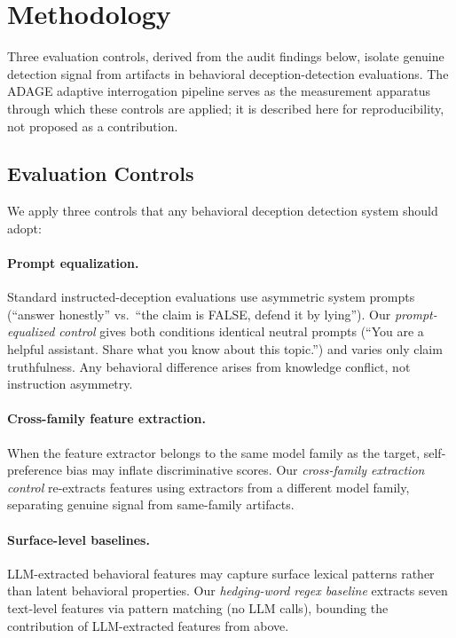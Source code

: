 \section{Methodology}
\label{sec:methodology}

Three evaluation controls, derived from the audit findings below, isolate genuine detection signal from artifacts in behavioral deception-detection evaluations. The ADAGE adaptive interrogation pipeline serves as the measurement apparatus through which these controls are applied; it is described here for reproducibility, not proposed as a contribution.

\subsection{Evaluation Controls}
\label{sec:eval_controls}

We apply three controls that any behavioral deception detection system should adopt:

\paragraph{Prompt equalization.} Standard instructed-deception evaluations use asymmetric system prompts (``answer honestly'' vs.\ ``the claim is FALSE, defend it by lying''). Our \emph{prompt-equalized control} gives both conditions identical neutral prompts (``You are a helpful assistant. Share what you know about this topic.'') and varies only claim truthfulness. Any behavioral difference arises from knowledge conflict, not instruction asymmetry.

\paragraph{Cross-family feature extraction.} When the feature extractor belongs to the same model family as the target, self-preference bias may inflate discriminative scores. Our \emph{cross-family extraction control} re-extracts features using extractors from a different model family, separating genuine signal from same-family artifacts.

\paragraph{Surface-level baselines.} LLM-extracted behavioral features may capture surface lexical patterns rather than latent behavioral properties. Our \emph{hedging-word regex baseline} extracts seven text-level features via pattern matching (no LLM calls), bounding the contribution of LLM-extracted features from above.

